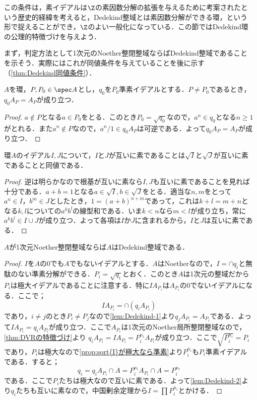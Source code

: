 この条件は，素イデアルは$\Z$の素因数分解の拡張を与えるために考案されたという歴史的経緯を考えると，Dedekind整域とは素因数分解ができる環，という形で捉えることができ，$\Z$のよい一般化になっている．この節ではDedekind環の公理的特徴づけを与えよう．

まず，判定方法として1次元のNoether整閉整域ならばDedekind整域であることを示そう．実際にはこれが同値条件を与えていることを後に示す（\ref{thm:Dedekind同値条件}）．

\begin{lem}\label{lem:Dedekind-1}
	$A$を環，$P,P_0\in\spec A$とし，$
	q_0$を$P_0$準素イデアルとする．$P\neq P_0$であるとき，$q_0A_P=A_P$が成り立つ．
\end{lem}

\begin{proof}
	$a\not\in P$となる$a\in P_0$をとる．このとき$P_0=\sqrt{q_0}$なので，$a^n\in q_0$となる$n\geq1$がとれる．また$a^n\not\in P$なので，$a^n/1\in q_0A_P$は可逆である．よって$q_0A_P=A_P$が成り立つ．
\end{proof}

\begin{lem}\label{lem:Dedekind-2}
	環$A$のイデアル$I,J$について，$I$と$J$が互いに素であることは$\sqrt{I}$と$\sqrt{J}$が互いに素であることと同値である．
\end{lem}

\begin{proof}
	逆は明らかなので根基が互いに素なら$I,J$も互いに素であることを見れば十分である．$a+b=1$となる$a\in\sqrt{I},b\in\sqrt{J}$をとる．適当な$n,m$をとって$a^n\in I，b^m\in J$としたとき，$1=(a+b)^{n+m}$であって，これは$k+l=m+n$となる$k,l$についての$a^kb^l$の線型和である．いま$k<n$なら$m<l$が成り立ち，常に$a^kb^l\in I\cup J$が成り立つ．よって各項は$I$か$J$に含まれるから，$I$と$J$は互いに素である．
\end{proof}

\begin{thm}\label{thm:1dimNoether整閉整域ならDedekind}
	$A$が1次元Noether整閉整域ならば$A$はDedekind整域である．
\end{thm}

\begin{proof}
	$I$を$A$の0でも$A$でもないイデアルとする．$A$はNoetherなので，$I=\cap q_i$と無駄のない準素分解ができる．$P_i=\sqrt{q_i}$とおく．このとき$A$は1次元の整域だから$P_i$は極大イデアルであることに注意する．特に$IA_{P_i}$は$A_{P_i}$の0でないイデアルになる．ここで；
	\[IA_{P_i}=\cap (q_iA_{P_i})\]
	であり，$i\neq j$のとき$P_i\neq P_j$なので\ref{lem:Dedekind-1}より$q_jA_{P_i}=A_{P_i}$である．よって$IA_{P_i}=q_iA_{P_i}$が成り立つ．ここで$A_{P_i}$は1次元のNoether局所整閉整域なので，\ref{thm:DVRの特徴づけ}より $q_iA_{P_i}=IA_{P_i}=P_i^{n_i}A_{P_i}$が成り立つ．ここで$\sqrt{P_i^{n_i}}=P_i$であり，$P_i$は極大なので\ref{prop:sqrt{I}が極大なら準素}より$P_i^{n_i}$も$P_i$準素イデアルである．すると；
	\[q_i=q_iA_{P_i}\cap A=P_i^{n_i}A_{P_i}\cap A=P_i^{n_i}\]
	である．ここで$P_i$たちは極大なので互いに素である．よって\ref{lem:Dedekind-2}より$q_i$たちも互いに素なので，中国剰余定理から$I=\prod P_i^{n_i}$とかける．
\end{proof}

